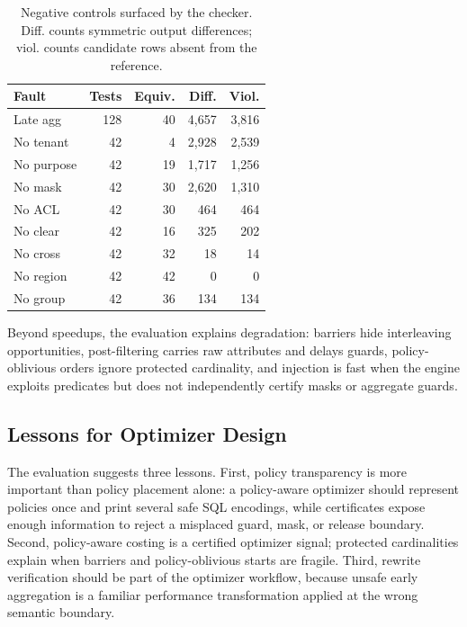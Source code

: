 \documentclass[conference]{IEEEtran}
\begin{document}
\begin{table}[t]
\centering
\caption{Negative controls surfaced by the checker. Diff. counts symmetric output differences; viol. counts candidate rows absent from the reference.}
\label{tab:failures}
\begin{tabular}{lrrrr}
\toprule
Fault & Tests & Equiv. & Diff. & Viol. \\
\midrule
Late agg & 128 & 40 & 4,657 & 3,816 \\
No tenant & 42 & 4 & 2,928 & 2,539 \\
No purpose & 42 & 19 & 1,717 & 1,256 \\
No mask & 42 & 30 & 2,620 & 1,310 \\
No ACL & 42 & 30 & 464 & 464 \\
No clear & 42 & 16 & 325 & 202 \\
No cross & 42 & 32 & 18 & 14 \\
No region & 42 & 42 & 0 & 0 \\
No group & 42 & 36 & 134 & 134 \\
\bottomrule
\end{tabular}
\end{table}

Beyond speedups, the evaluation explains degradation: barriers hide interleaving opportunities, post-filtering carries raw attributes and delays guards, policy-oblivious orders ignore protected cardinality, and injection is fast when the engine exploits predicates but does not independently certify masks or aggregate guards.

\subsection{Lessons for Optimizer Design}
The evaluation suggests three lessons. First, policy transparency is more important than policy placement alone: a policy-aware optimizer should represent policies once and print several safe SQL encodings, while certificates expose enough information to reject a misplaced guard, mask, or release boundary. Second, policy-aware costing is a certified optimizer signal; protected cardinalities explain when barriers and policy-oblivious starts are fragile. Third, rewrite verification should be part of the optimizer workflow, because unsafe early aggregation is a familiar performance transformation applied at the wrong semantic boundary.
\end{document}
